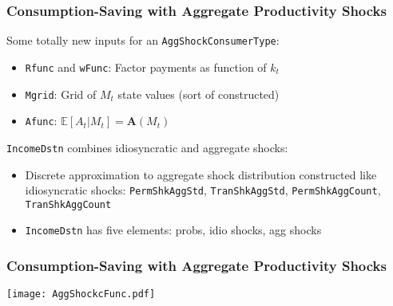 \documentclass[11ptt]{beamer}
\newcommand{\E}{\mathbb{E}}
\begin{document}
\begin{frame}
\frametitle{Consumption-Saving with Aggregate Productivity Shocks}
Some totally new inputs for an \texttt{AggShockConsumerType}:
\begin{itemize}
\item \texttt{Rfunc} and \texttt{wFunc}: Factor payments as function of $k_t$

\item \texttt{Mgrid}: Grid of $M_t$ state values (sort of constructed)

\item \texttt{Afunc}: $\E[A_t | M_t] = \mathbf{A}(M_t)$
\end{itemize}

\texttt{IncomeDstn} combines idiosyncratic and aggregate shocks:
\begin{itemize}
\item Discrete approximation to aggregate shock distribution constructed like idiosyncratic shocks: \texttt{PermShkAggStd}, \texttt{TranShkAggStd}, \texttt{PermShkAggCount}, \texttt{TranShkAggCount}

\item \texttt{IncomeDstn} has five elements: probs, idio shocks, agg shocks
\end{itemize}
\end{frame}

\begin{frame}
\frametitle{Consumption-Saving with Aggregate Productivity Shocks}
\begin{center}
\texttt{[image: AggShockcFunc.pdf]}
\end{center}
\end{frame}
\end{document}
